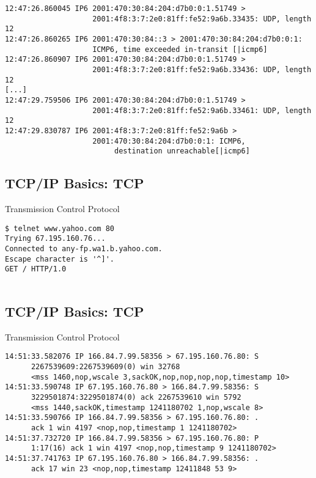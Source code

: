 \documentclass[xga]{xdvislides}
\begin{document}
\begin{verbatim}
12:47:26.860045 IP6 2001:470:30:84:204:d7b0:0:1.51749 >
                    2001:4f8:3:7:2e0:81ff:fe52:9a6b.33435: UDP, length 12
12:47:26.860265 IP6 2001:470:30:84::3 > 2001:470:30:84:204:d7b0:0:1:
                    ICMP6, time exceeded in-transit [|icmp6]
12:47:26.860907 IP6 2001:470:30:84:204:d7b0:0:1.51749 >
                    2001:4f8:3:7:2e0:81ff:fe52:9a6b.33436: UDP, length 12
[...]
12:47:29.759506 IP6 2001:470:30:84:204:d7b0:0:1.51749 >
                    2001:4f8:3:7:2e0:81ff:fe52:9a6b.33461: UDP, length 12
12:47:29.830787 IP6 2001:4f8:3:7:2e0:81ff:fe52:9a6b >
                    2001:470:30:84:204:d7b0:0:1: ICMP6,
                         destination unreachable[|icmp6]
\end{verbatim}

\subsection{TCP/IP Basics: TCP}
\begin{center}
Transmission Control Protocol
\end{center}
\vspace{.2in}
\begin{verbatim}
$ telnet www.yahoo.com 80
Trying 67.195.160.76...
Connected to any-fp.wa1.b.yahoo.com.
Escape character is '^]'.
GET / HTTP/1.0


\end{verbatim}

\subsection{TCP/IP Basics: TCP}
\begin{center}
Transmission Control Protocol
\end{center}
\vspace{.2in}
\begin{verbatim}
14:51:33.582076 IP 166.84.7.99.58356 > 67.195.160.76.80: S
      2267539609:2267539609(0) win 32768
      <mss 1460,nop,wscale 3,sackOK,nop,nop,nop,nop,timestamp 10>
14:51:33.590748 IP 67.195.160.76.80 > 166.84.7.99.58356: S
      3229501874:3229501874(0) ack 2267539610 win 5792
      <mss 1440,sackOK,timestamp 1241180702 1,nop,wscale 8>
14:51:33.590766 IP 166.84.7.99.58356 > 67.195.160.76.80: .
      ack 1 win 4197 <nop,nop,timestamp 1 1241180702>
14:51:37.732720 IP 166.84.7.99.58356 > 67.195.160.76.80: P
      1:17(16) ack 1 win 4197 <nop,nop,timestamp 9 1241180702>
14:51:37.741763 IP 67.195.160.76.80 > 166.84.7.99.58356: .
      ack 17 win 23 <nop,nop,timestamp 12411848 53 9>
\end{verbatim}
\end{document}
